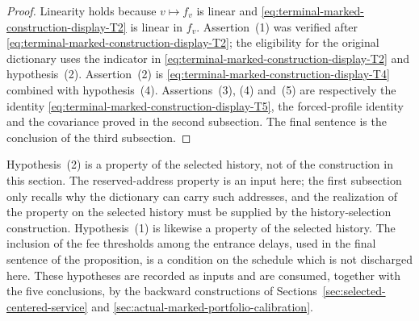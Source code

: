 \begin{proof}
Linearity holds because $v\mapsto f_v$ is linear and \eqref{eq:terminal-marked-construction-display-T2} is linear in
$f_v$. Assertion~(1) was verified after \eqref{eq:terminal-marked-construction-display-T2}; the eligibility for the
original dictionary uses the indicator in \eqref{eq:terminal-marked-construction-display-T2} and hypothesis~(2).
Assertion~(2) is \eqref{eq:terminal-marked-construction-display-T4} combined with hypothesis~(4). Assertions~(3), (4)
and~(5) are respectively the identity \eqref{eq:terminal-marked-construction-display-T5}, the forced-profile identity
and the covariance proved in the second subsection. The final sentence is
the conclusion of the third subsection.
\end{proof}

Hypothesis~(2) is a property of the selected history, not of the
construction in this section. The reserved-address property is an input
here; the first subsection only recalls why the dictionary can carry such
addresses, and the realization of the property on the selected history
must be supplied by the history-selection construction. Hypothesis~(1)
is likewise a property of the selected history. The inclusion of the fee
thresholds among the entrance delays, used in the final sentence of the
proposition, is a condition on the schedule which is not discharged
here. These hypotheses are recorded as inputs and are consumed,
together with the five conclusions, by the backward constructions of
Sections~\ref{sec:selected-centered-service} and
\ref{sec:actual-marked-portfolio-calibration}.
